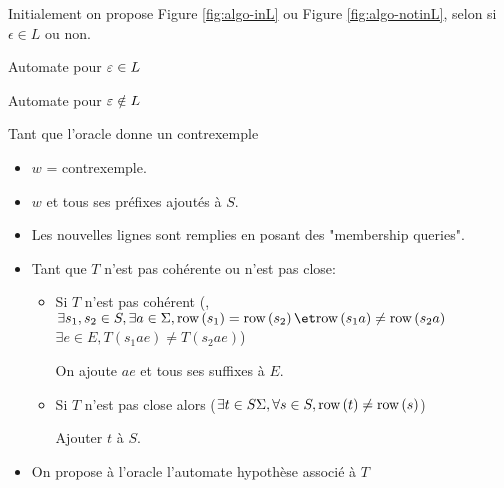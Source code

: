 Initialement on propose Figure \ref{fig:algo-inL} ou Figure \ref{fig:algo-notinL}, selon si $\epsilon \in L$ ou non.

\begin{twoautomata}
	\centering
	\caption{Automate pour $\varepsilon \in L$}\label{fig:algo-inL}
\end{twoautomata}
\begin{twoautomata}
	\centering
	\caption{Automate pour $\varepsilon \notin L$}\label{fig:algo-notinL}
\end{twoautomata}

Tant que l'oracle donne un contrexemple
\begin{itemize}
	\item $w$ = contrexemple.
	\item $w$ et tous ses préfixes ajoutés à $S$.
	\item Les nouvelles lignes sont remplies en posant des "membership queries".
	\item Tant que $T$ n'est pas cohérente ou n'est pas close:
	      \begin{itemize}
		      \item Si $T$ n'est pas cohérent (\cad, $\exists s_1, s_2 \in S, \exists a \in \alphabet, \row{s_1} = \row{s_2} \et \row{s_1a} \neq \row{s_2a}$
		            \cad $\exists e \in E, T (s_1ae) \neq T(s_2ae)$)

		            On ajoute $ae$ et tous ses suffixes à $E$.
		      \item Si $T$ n'est pas close alors ($\exists t \in S \Sigma, \forall s \in S, \text{row}\left(t\right) \neq \text{row}\left(s\right)$)

		            Ajouter $t$ à $S$.
	      \end{itemize}
	\item On propose à l'oracle l'automate hypothèse associé à $T$
\end{itemize}

